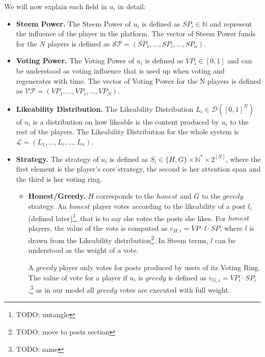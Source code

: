       We will now explain each field in $u_i$ in detail:
      \begin{itemize}
        \item \textbf{Steem Power.} The Steem Power of $u_i$ is defined as
        $SP_{i} \in \mathbb{N}$ and represent the influence of the player in the
        platform. The vector of Steem Power funds for the $N$ players is defined
        as $\mathcal{SP} = \left(SP_{1}, \dots, SP_{i}, \dots, SP_{n}\right)$.
        \item \textbf{Voting Power.} The Voting Power of $u_i$ is defined as
        $VP_i \in \left[0, 1\right]$ and can be understood as  voting influence
        that is used up when voting and regenerates with time. The vector of
        Voting Power for the N players is defined as $\mathcal{VP} = \left(VP_1,
        \dots, VP_i, \dots, VP_N\right)$.

        \item \textbf{Likeability Distribution.} The Likeability Distribution
        $L_i\in \mathcal{D}\left([0,1]^N\right)$ of $u_i$ is a distribution on
        how likeable is the content produced by $u_i$ to the rest of the
        players. The Likeability Distribution for the whole system is
        $\mathcal{L} = \left(L_1, \dots, L_i, \dots, L_n\right)$.

        \item \textbf{Strategy.} The strategy of $u_i$ is defined as $S_i \in
        \lbrace H, G \rbrace \times \mathbb{N}^* \times 2^{\left[N\right]}$,
        where the first element is the player's core strategy, the second is her
        attention span and the third is her voting ring.
        \begin{itemize}
          \item \textbf{Honest/Greedy.} $H$ corresponds to the $honest$ and $G$
          to the $greedy$ strategy. An $honest$ player votes according to the
          likeability of a post $l_i$ (defined later)\footnote{TODO: untangle},
          that is to say she votes the posts she likes. For $honest$ players, the
          value of the vote is computed as $v_{H,i} = VP \cdot l \cdot SP$, where
          $l$ is drawn from the Likeability distribution\footnote{TODO: move to
          posts section}. In Steem terms, $l$ can be understood as the weight of
          a vote.

          A $greedy$ player only votes for posts produced by users of its
          Voting Ring. The value of vote for a player if $u_i$ is $greedy$ is
          defined as $v_{G,i} = VP_i \cdot SP_i$,\footnote{TODO: same} as in our
          model all $greedy$ votes are executed with full weight.


\end{itemize}
\end{itemize}
